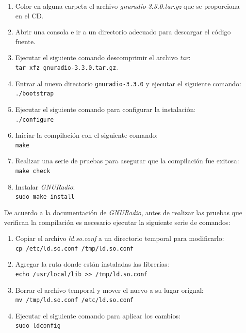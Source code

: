 \begin{enumerate}
  \item Color en alguna carpeta el archivo \emph{gnuradio-3.3.0.tar.gz} que se proporciona en el CD.
  \item Abrir una consola e ir a un directorio adecuado para descargar el
  c\'odigo fuente.
  \item Ejecutar el siguiente comando descomprimir el archivo \emph{tar}:\\
  \verb|tar xfz gnuradio-3.3.0.tar.gz|.
  \item Entrar al nuevo directorio \verb|gnuradio-3.3.0| y ejecutar el siguiente comando:\\
  \verb|./bootstrap|
  \item Ejecutar el siguiente comando para configurar la instalaci\'on:\\
  \verb|./configure|
  \item Iniciar la compilaci\'on con el siguiente comando: \\
  \verb|make|
  \item Realizar una serie de pruebas para asegurar que la compilaci\'on fue
  exitosa:\\
  \verb|make check|
  \item Instalar \emph{GNURadio}: \\
  \verb|sudo make install|
\end{enumerate}

De acuerdo a la documentaci\'on de \emph{GNURadio}, antes de realizar las
pruebas que verifican la compilaci\'on es necesario ejecutar la siguiente serie
de comandos:

\begin{enumerate}
  \item Copiar el archivo \emph{ld.so.conf} a un directorio temporal para
  modificarlo:\\
  \verb|cp /etc/ld.so.conf /tmp/ld.so.conf|
  \item Agregar la ruta donde est\'an instaladas las librer\'ias:\\
  \verb|echo /usr/local/lib >> /tmp/ld.so.conf|
  \item Borrar el archivo temporal y mover el nuevo a su lugar orignal:\\
  \verb|mv /tmp/ld.so.conf /etc/ld.so.conf|
  \item Ejecutar el siguiente comando para aplicar los cambios:\\
  \verb|sudo ldconfig|
\end{enumerate}

